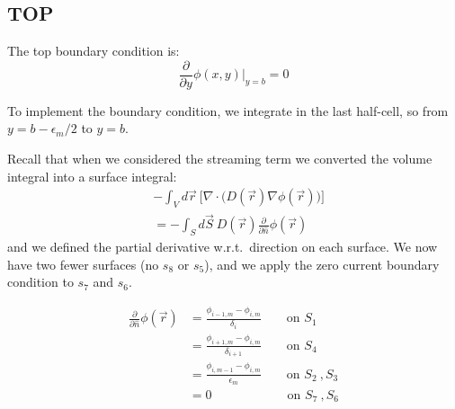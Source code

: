 \documentclass[12pt]{article}
\begin{document}
\newpage
\subsection*{TOP}
The top boundary condition is:
\[\frac{\partial }{\partial y} \phi(x,y)\big|_{y=b} = 0\]


To implement the boundary condition, we integrate in the last half-cell, so from $y=b-\epsilon_m / 2$ to $y=b$. 

Recall that when we considered the streaming term we converted the volume integral into a surface integral: 
\begin{align}
&-\int_V d\vec{r}\:\bigl[\nabla \cdot \bigl(D(\vec{r})\nabla \phi(\vec{r})\bigr)\bigr] \nonumber \\
 &= -\int_S d\vec{S} \:D(\vec{r})\frac{\partial}{\partial \hat{n}}\phi(\vec{r}) \nonumber
\end{align}
%
and we defined the partial derivative w.r.t.\ direction on each surface. We now have two fewer surfaces (no $s_8$ or $s_5$), and we apply the zero current boundary condition to $s_7$ and $s_6$.


\begin{align}
\frac{\partial}{\partial \hat{n}}\phi(\vec{r}) &= \frac{\phi_{i-1,m} - \phi_{i,m}}{\delta_{i}} \qquad \text{on } S_1  \nonumber \\
%
&= \frac{\phi_{i+1,m} - \phi_{i,m}}{\delta_{i+1}} \qquad \text{on } S_4 \nonumber \\
%
&= \frac{\phi_{i,m-1} - \phi_{i,m}}{\epsilon_m} \qquad \text{on } S_2 \:, S_3 \nonumber \\
%
&= 0 \qquad \qquad \qquad \text{on } S_7 \:, S_6 \nonumber 
\end{align}
\end{document}
